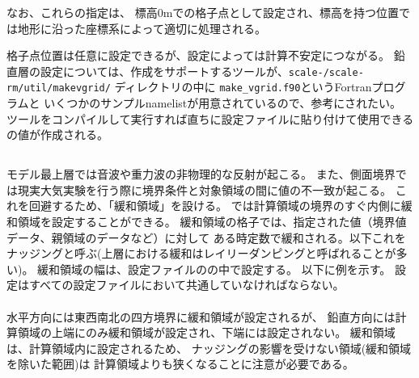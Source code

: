 なお、これらの指定は、
標高0mでの格子点として設定され、標高を持つ位置では地形に沿った座標系によって適切に処理される。

格子点位置は任意に設定できるが、設定によっては計算不安定につながる。
鉛直層の設定については、作成をサポートするツールが、\texttt{scale-\version/scale-rm/util/makevgrid/}
ディレクトリの中に \verb|make_vgrid.f90|というFortranプログラムと
いくつかのサンプルnamelistが用意されているので、参考にされたい。
ツールをコンパイルして実行すれば直ちに設定ファイルに貼り付けて使用できる
の値が作成される。


\subsection{\SecBasicBufferSetting} \label{subsec:buffer}
モデル最上層では音波や重力波の非物理的な反射が起こる。
また、側面境界では現実大気実験を行う際に境界条件と対象領域の間に値の不一致が起こる。
これを回避するため、「緩和領域」を設ける。
\scalerm では計算領域の境界のすぐ内側に緩和領域を設定することができる。
緩和領域の格子では、指定された値（境界値データ、親領域のデータなど）に対して
ある時定数で緩和される。以下これをナッジングと呼ぶ(上層における緩和はレイリーダンピングと呼ばれることが多い)。
緩和領域の幅は、設定ファイルのの中で設定する。
以下に例を示す。
設定はすべての設定ファイルにおいて共通していなければならない。\\

\\

水平方向には東西南北の四方境界に緩和領域が設定されるが、
鉛直方向には計算領域の上端にのみ緩和領域が設定され、下端には設定されない。
%
緩和領域は、計算領域内に設定されるため、
ナッジングの影響を受けない領域(緩和領域を除いた範囲)は
計算領域よりも狭くなることに注意が必要である。

